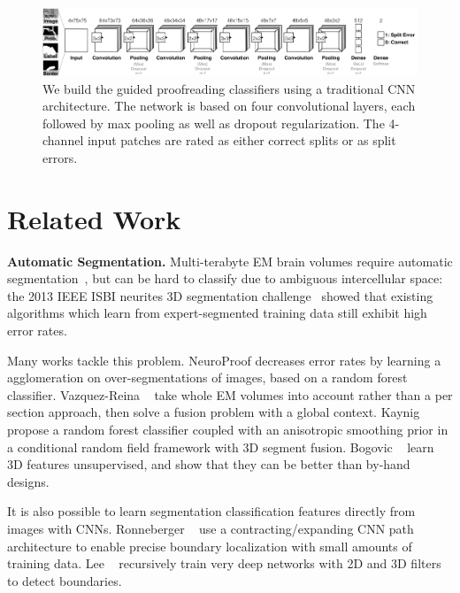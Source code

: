 \begin{figure}[t]
\begin{center}
\includegraphics[width=\linewidth]{gfx/architecture.png}
\end{center}
  \vspace{-4mm}
   \caption{We build the guided proofreading classifiers using a traditional CNN architecture. The network is based on four convolutional layers, each followed by max pooling as well as dropout regularization. The 4-channel input patches are rated as either correct splits or as split errors.}
\label{fig:architecture}
\end{figure}

\section{Related Work}

\textbf{Automatic Segmentation.} Multi-terabyte EM brain volumes require automatic segmentation~\cite{jain2010,Liu2014,NunezIglesias2013Machine,GALA2014}, but can be hard to classify due to ambiguous intercellular space: the 2013 IEEE ISBI neurites 3D segmentation challenge~\cite{isbi_challenge} showed that existing algorithms which learn from expert-segmented training data still exhibit high error rates. 

Many works tackle this problem. NeuroProof \cite{neuroproof2013} decreases error rates by learning a agglomeration on over-segmentations of images, based on a random forest classifier. Vazquez-Reina \etal~\cite{amelio_segmentation} take whole EM volumes into account rather than a per section approach, then solve a fusion problem with a global context. Kaynig \etal~\cite{kaynig10} propose a random forest classifier coupled with an anisotropic smoothing prior in a conditional random field framework with 3D segment fusion. Bogovic \etal~\cite{BogovicHJ13} learn 3D features unsupervised, and show that they can be better than by-hand designs. 

It is also possible to learn segmentation classification features directly from images with CNNs. Ronneberger \etal~\cite{RonnebergerFB15} use a contracting/expanding CNN path architecture to enable precise boundary localization with small amounts of training data. Lee \etal~\cite{lee2015recursive} recursively train very deep networks with 2D and 3D filters to detect boundaries.


